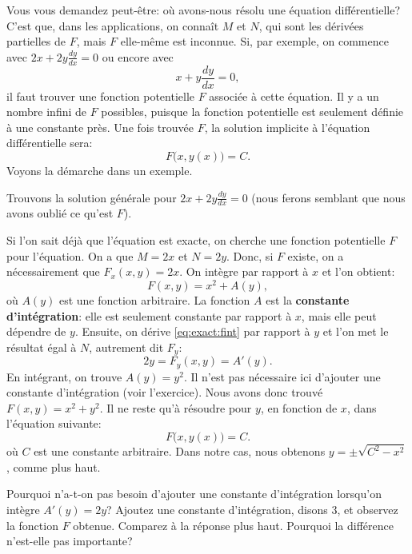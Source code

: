 Vous vous demandez peut-être: où avons-nous résolu une équation différentielle?
C'est que, dans les applications, on connaît $M$ et $N$, qui sont les dérivées partielles de $F$, mais $F$ elle-même est inconnue.
Si, par exemple, on commence avec $2x + 2y \frac{dy}{dx} = 0$ ou encore avec
\begin{equation*}
	x + y \frac{dy}{dx} = 0,
\end{equation*}
il faut trouver une fonction potentielle $F$ associée à cette équation.
Il y a un nombre infini de $F$ possibles, puisque la fonction potentielle est seulement définie à une constante près.
Une fois trouvée $F$, la solution implicite à l'équation différentielle sera:
\begin{equation*}
	F\bigl(x,y(x)\bigr) = C.
\end{equation*}
Voyons la démarche dans un exemple.
\begin{example}
	Trouvons la solution générale pour 	$2x + 2y \frac{dy}{dx} = 0$ 
	(nous ferons semblant que nous avons oublié ce qu'est $F$).

	Si l'on sait déjà que l'équation est exacte, on cherche une fonction potentielle $F$ pour l'équation.
	On a que $M = 2x$ et $N=2y$.
	Donc, si $F$ existe, on a nécessairement que $F_x (x,y) = 2x$.
	On intègre par rapport à $x$ et l'on obtient:
	\begin{equation} \label{eq:exact:fint}
		F(x,y) = x^2 + A(y),
	\end{equation}
	où $A(y)$ est une fonction arbitraire.  
	La fonction $A$ est la {\bf constante d'intégration}:
	elle est seulement constante par rapport à $x$, mais elle peut dépendre de $y$.
	Ensuite, on dérive \eqref{eq:exact:fint} par rapport à $y$ et l'on met le résultat égal à $N$, autrement dit $F_y$:
	\begin{equation*}
		2y = F_y (x,y) = A'(y) .
	\end{equation*}
	En intégrant, on trouve $A(y) = y^2$.  Il n'est pas nécessaire ici d'ajouter une constante d'intégration	(voir l'exercice).    
	Nous avons donc trouvé $F(x,y) = x^2+y^2$.
	Il ne reste qu'à résoudre pour $y$, en fonction de $x$, dans l'équation suivante:
	\begin{equation*}
		F\bigl(x,y(x)\bigr) = C .
	\end{equation*}
	où $C$ est une constante arbitraire. Dans notre cas, nous obtenons $y = \pm \sqrt{C^2-x^2}$, comme plus haut.
\end{example}

\begin{exercise}\label{exer:exact}
	Pourquoi n'a-t-on pas besoin d'ajouter une constante d'intégration lorsqu'on intègre $A'(y) = 2y$?
	Ajoutez une constante d'intégration, disons 3, et observez la fonction $F$ obtenue.
	Comparez à la réponse plus haut.  Pourquoi la différence n'est-elle pas importante?
\end{exercise}

